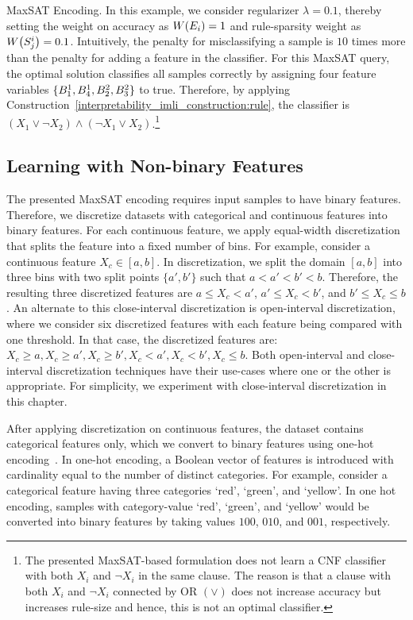 \begin{example}{MaxSAT Encoding.}
In this example, we consider regularizer $ \lambda = 0.1 $, thereby setting the weight on accuracy as $ W \! \left( E_i \right) = 1 $ and rule-sparsity weight as $ W \! \left( S_j^i \right) = 0.1 $. Intuitively, the penalty for misclassifying a sample is $ 10 $ times more than the penalty for adding a feature in the classifier. For this MaxSAT query, the optimal solution classifies all samples correctly by assigning four feature variables $ \{B^1_1, B^1_4, B^2_2, B^2_3\} $ to true. Therefore, by applying Construction~\ref{interpretability_imli_construction:rule}, the classifier is $ (X_1 \vee \neg X_2)  \wedge (\neg X_1 \vee X_2) $.\footnote{The presented MaxSAT-based formulation does not learn a CNF classifier with both $ X_i $ and $ \neg X_i $ in the same clause. The reason is that a clause with both $ X_i $ and $ \neg X_i $ connected by OR $ (\vee) $ does not increase accuracy but increases rule-size and hence, this is not an optimal classifier.}
	
\end{example}
	
	
\subsection{Learning with Non-binary Features}
	\label{interpretability_imli_sec:non-binary}
	The presented MaxSAT encoding requires input samples to have binary features. Therefore, we discretize datasets with categorical and continuous features into binary features. For each continuous feature, we apply equal-width discretization that splits the feature into a fixed number of bins. For example, consider a continuous feature $ X_c \in [a,b] $. In discretization, we split the domain $ [a,b] $ into three bins with two split points $ \{a',b'\} $ such that $ a<a'<b'<b $.  Therefore, the resulting three discretized features are $ { a \le X_c < a'} $, $ {a' \le X_c < b'} $, and $ { b' \le X_c  \le b } $. An alternate to this close-interval discretization is open-interval discretization, where we consider six discretized features with each feature being compared with one threshold. In that case, the discretized features are: $ X_c \ge a, X_c \ge a', X_c \ge b', X_c < a', X_c < b', X_c \le b $. Both open-interval and close-interval discretization techniques have their use-cases where one or the other is appropriate. For simplicity, we experiment with close-interval discretization in this chapter.
	
	After applying discretization on continuous features, the dataset contains categorical features only, which we convert to binary features using one-hot encoding~\cite{lakkaraju2019faithful}. In one-hot encoding, a Boolean vector of features is introduced with cardinality equal to the number of distinct categories. For example, consider a categorical feature having three categories `red', `green', and `yellow'. In one hot encoding, samples with category-value `red', `green', and `yellow' would be converted into binary features by taking values $ 100 $, $ 010 $, and $ 001 $, respectively. 
	
